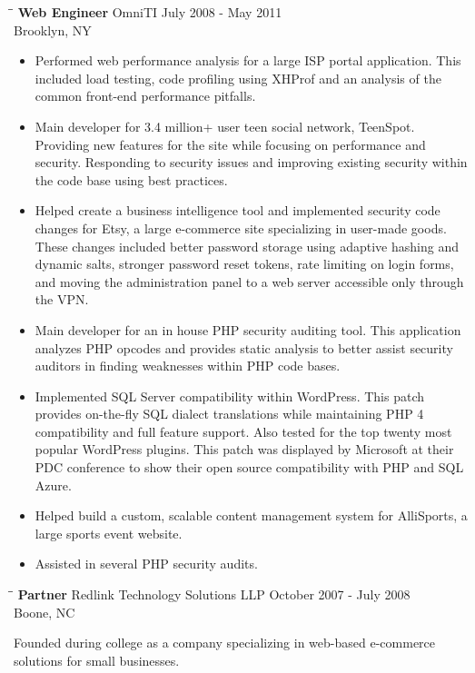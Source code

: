 \documentclass{res}
\begin{document}
\begin{resume}
   \begin{tabbing}%
   \hspace{2.3in}\= \hspace{2.6in}\= \kill %
   {\bf Web Engineer}  \>OmniTI \> July 2008 - May 2011\\
                          \>Brooklyn, NY
   \end{tabbing}\vspace{-5pt}
   \begin{itemize}
    \item Performed web performance analysis for a large ISP portal application. This included load testing, code profiling using XHProf and an analysis of the common front-end performance pitfalls.
    \item Main developer for 3.4 million+ user teen social network, TeenSpot. Providing new features for the site while focusing on performance and security. Responding to security issues and improving existing security within the code base using best practices.
    \item Helped create a business intelligence tool and implemented security code changes for Etsy, a large e-commerce site specializing in user-made goods. These changes included better password storage using adaptive hashing and dynamic salts, stronger password reset tokens, rate limiting on login forms, and moving the administration panel to a web server accessible only through the VPN.
    \item Main developer for an in house PHP security auditing tool. This application analyzes PHP opcodes and provides static analysis to better assist security auditors in finding weaknesses within PHP code bases.
    \item Implemented SQL Server compatibility within WordPress. This patch provides on-the-fly SQL dialect translations while maintaining PHP 4 compatibility and full feature support. Also tested for the top twenty most popular WordPress plugins. This patch was displayed by Microsoft at their PDC conference to show their open source compatibility with PHP and SQL Azure.
    \item Helped build a custom, scalable content management system for AlliSports, a large sports event website.
    \item Assisted in several PHP security audits.   
    \end{itemize} 
    
    \begin{tabbing}%
   \hspace{2.3in}\= \hspace{2.6in}\= \kill %
   {\bf Partner}  \>Redlink Technology Solutions LLP \> October 2007 - July 2008\\
                          \>Boone, NC
   \end{tabbing}\vspace{-10pt}
    Founded during college as a company specializing in web-based e-commerce solutions for small businesses. 


\end{resume}
\end{document}
